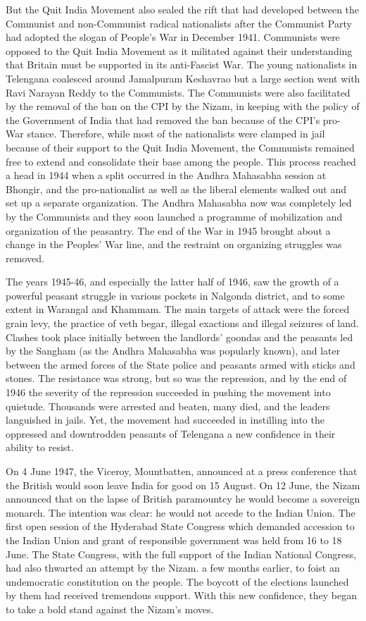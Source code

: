 But the Quit India Movement also sealed the rift that had developed between the Communist and non-Communist radical nationalists after the Communist Party had adopted the slogan of People’s War in December 1941. Communists were opposed to the Quit India Movement as it militated against their understanding that Britain must be supported in its anti-Fascist War. The young nationalists in Telengana coalesced around Jamalpuram Keshavrao but a large section went with Ravi Narayan Reddy to the Communists. The Communists were also facilitated by the removal of the ban on the CPI by the Nizam, in keeping with the policy of the Government of India that had removed the ban because of the CPI’s pro- War stance. Therefore, while most of the nationalists were clamped in jail because of their support to the Quit India Movement, the Communists remained free to extend and consolidate their base among the people. This process reached a head in 1944 when a split occurred in the Andhra Mahasabha session at Bhongir, and the pro-nationalist as well as the liberal elements walked out and set up a separate organization. The Andhra Mahasabha now was completely led by the Communists and they soon launched a programme of mobilization and organization of the peasantry. The end of the War in 1945 brought about a change in the Peoples’ War line, and the restraint on organizing struggles was removed. 

The years 1945-46, and especially the latter half of 1946, saw the growth of a powerful peasant struggle in various pockets in Nalgonda district, and to some extent in Warangal and Khammam. The main targets of attack were the forced grain levy, the practice of veth begar, illegal exactions and illegal seizures of land. Clashes took place initially between the landlords’ goondas and the peasants led by the Sangham (as the Andhra Mahasabha was popularly known), and later between the armed forces of the State police and peasants armed with sticks and stones. The resistance was strong, but so was the repression, and by the end of 1946 the severity of the repression succeeded in pushing the movement into quietude. Thousands were arrested and beaten, many died, and the leaders languished in jails. Yet, the movement had succeeded in instilling into the oppressed and downtrodden peasants of Telengana a new confidence in their ability to resist. 

On 4 June 1947, the Viceroy, Mountbatten, announced at a press conference that the British would soon leave India for good on 15 August. On 12 June, the Nizam announced that on the lapse of British paramountcy he would become a sovereign monarch. The intention was clear: he would not accede to the Indian Union. The first open session of the Hyderabad State Congress which demanded accession to the Indian Union and grant of responsible government was held from 16 to 18 June. The State Congress, with the full support of the Indian National Congress, had also thwarted an attempt by the Nizam. a few months earlier, to foist an undemocratic constitution on the people. The boycott of the elections launched by them had received tremendous support. With this new confidence, they began to take a bold stand against the Nizam’s moves. 

